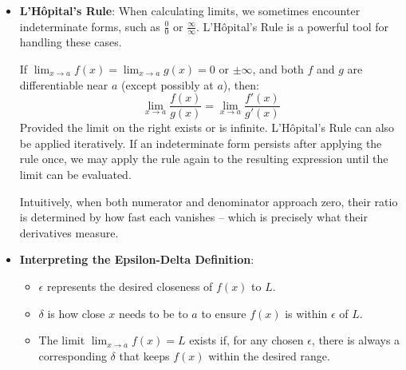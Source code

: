 \begin{itemize}
\item \textbf{L'Hôpital's Rule}: 
When calculating limits, we sometimes encounter indeterminate forms, such as $\frac{0}{0}$ or $\frac{\infty}{\infty}$. L'Hôpital's Rule is a powerful tool for handling these cases. 

    If $\lim_{x \to a} f(x) = \lim_{x \to a} g(x) = 0$ or $\pm \infty$, and both \( f \) and \( g \) are differentiable near \( a \) (except possibly at \( a \)), then:
    \[
    \lim_{x \to a} \frac{f(x)}{g(x)} = \lim_{x \to a} \frac{f'(x)}{g'(x)}
    \]
    Provided the limit on the right exists or is infinite. L'Hôpital's Rule can also be applied iteratively. If an indeterminate form persists after applying the rule once, we may apply the rule again to the resulting expression until the limit can be evaluated.

    Intuitively, when both numerator and denominator approach zero, their ratio is determined by how fast each vanishes -- which is precisely what their derivatives measure.

\item \textbf{Interpreting the Epsilon-Delta Definition}:
  \begin{itemize}
  \item $\epsilon$ represents the desired closeness of $f(x)$ to $L$.
  \item $\delta$ is how close $x$ needs to be to $a$ to ensure $f(x)$ is within $\epsilon$ of $L$.
  \item The limit $\lim_{x \to a} f(x) = L$ exists if, for any chosen $\epsilon$, there is always a corresponding $\delta$ that keeps $f(x)$ within the desired range.
  \end{itemize}
\end{itemize}

